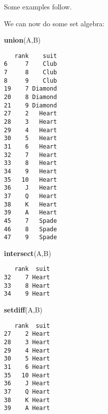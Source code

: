 \documentclass[]{book}
\newenvironment{Shaded}{\begin{snugshade}}{\end{snugshade}}
\newcommand{\KeywordTok}[1]{\textcolor[rgb]{0.13,0.29,0.53}{\textbf{{#1}}}}
\newcommand{\DecValTok}[1]{\textcolor[rgb]{0.00,0.00,0.81}{{#1}}}
\newcommand{\StringTok}[1]{\textcolor[rgb]{0.31,0.60,0.02}{{#1}}}
\newcommand{\NormalTok}[1]{{#1}}
\numberwithin{equation}{chapter}
\numberwithin{figure}{chapter}
\theoremstyle{plain}
\theoremstyle{definition}
\theoremstyle{remark}
\theoremstyle{definition}
\theoremstyle{definition}
\theoremstyle{remark}
\begin{document}
Some examples follow.

\begin{Shaded}
\end{Shaded}

We can now do some set algebra:

\begin{Shaded}
\begin{Highlighting}[]
\KeywordTok{union}\NormalTok{(A,B)}
\end{Highlighting}
\end{Shaded}

\begin{verbatim}
   rank    suit
6     7    Club
7     8    Club
8     9    Club
19    7 Diamond
20    8 Diamond
21    9 Diamond
27    2   Heart
28    3   Heart
29    4   Heart
30    5   Heart
31    6   Heart
32    7   Heart
33    8   Heart
34    9   Heart
35   10   Heart
36    J   Heart
37    Q   Heart
38    K   Heart
39    A   Heart
45    7   Spade
46    8   Spade
47    9   Spade
\end{verbatim}

\begin{Shaded}
\begin{Highlighting}[]
\KeywordTok{intersect}\NormalTok{(A,B)}
\end{Highlighting}
\end{Shaded}

\begin{verbatim}
   rank  suit
32    7 Heart
33    8 Heart
34    9 Heart
\end{verbatim}

\begin{Shaded}
\begin{Highlighting}[]
\KeywordTok{setdiff}\NormalTok{(A,B)}
\end{Highlighting}
\end{Shaded}

\begin{verbatim}
   rank  suit
27    2 Heart
28    3 Heart
29    4 Heart
30    5 Heart
31    6 Heart
35   10 Heart
36    J Heart
37    Q Heart
38    K Heart
39    A Heart
\end{verbatim}
\end{document}

